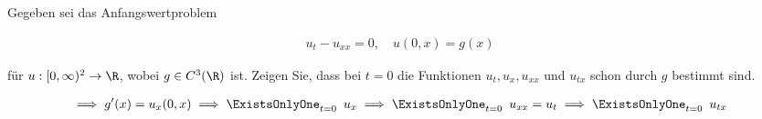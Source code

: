 
\begin{exercise}

Gegeben sei das Anfangswertproblem

\begin{align*}
    u_t - u_{xx} = 0,
    \quad
    u(0, x) = g(x)
\end{align*}

für $u: [0, \infty)^2 \to \R$, wobei $g \in C^3(\R)$ ist.
Zeigen Sie, dass bei $t = 0$ die Funktionen $u_t, u_x, u_{xx}$ und $u_{tx}$ schon durch $g$ bestimmt sind.

\end{exercise}


\begin{solution}

\begin{align*}
    \implies
    g^\prime(x) = u_x(0, x)
    \implies
    \ExistsOnlyOne_{t=0} \enspace u_x
    \implies
    \ExistsOnlyOne_{t=0} \enspace u_{xx} = u_t
    \implies
    \ExistsOnlyOne_{t=0} \enspace u_{tx}
\end{align*}

\end{solution}

